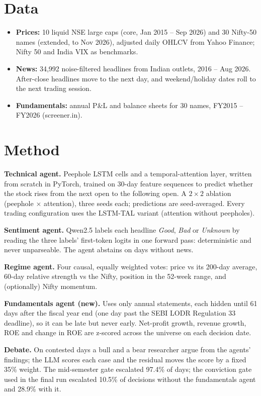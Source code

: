 \documentclass[10pt,a4paper]{article}
\begin{document}
\section{Data}
\begin{itemize}
\item \textbf{Prices:} 10 liquid NSE large caps (core, Jan 2015 -- Sep 2026) and 30 Nifty-50 names (extended, to Nov 2026), adjusted daily OHLCV from Yahoo Finance; Nifty 50 and India VIX as benchmarks.
\item \textbf{News:} 34,992 noise-filtered headlines from Indian outlets, 2016 -- Aug 2026. After-close headlines move to the next day, and weekend/holiday dates roll to the next trading session.
\item \textbf{Fundamentals:} annual P\&L and balance sheets for 30 names, FY2015 -- FY2026 (screener.in).
\end{itemize}

\section{Method}
\textbf{Technical agent.} Peephole LSTM cells and a temporal-attention layer, written from scratch in PyTorch, trained on 30-day feature sequences to predict whether the stock rises from the next open to the following open. A $2\times2$ ablation (peephole $\times$ attention), three seeds each; predictions are seed-averaged. Every trading configuration uses the LSTM-TAL variant (attention without peepholes).

\textbf{Sentiment agent.} Qwen2.5 labels each headline \emph{Good}, \emph{Bad} or \emph{Unknown} by reading the three labels' first-token logits in one forward pass: deterministic and never unparseable. The agent abstains on days without news.

\textbf{Regime agent.} Four causal, equally weighted votes: price vs its 200-day average, 60-day relative strength vs the Nifty, position in the 52-week range, and (optionally) Nifty momentum.

\textbf{Fundamentals agent (new).} Uses only annual statements, each hidden until 61 days after the fiscal year end (one day past the SEBI LODR Regulation 33 deadline), so it can be late but never early. Net-profit growth, revenue growth, ROE and change in ROE are z-scored across the universe on each decision date.

\textbf{Debate.} On contested days a bull and a bear researcher argue from the agents' findings; the LLM scores each case and the residual moves the score by a fixed 35\% weight. The mid-semester gate escalated 97.4\% of days; the conviction gate used in the final run escalated 10.5\% of decisions without the fundamentals agent and 28.9\% with it.
\end{document}
